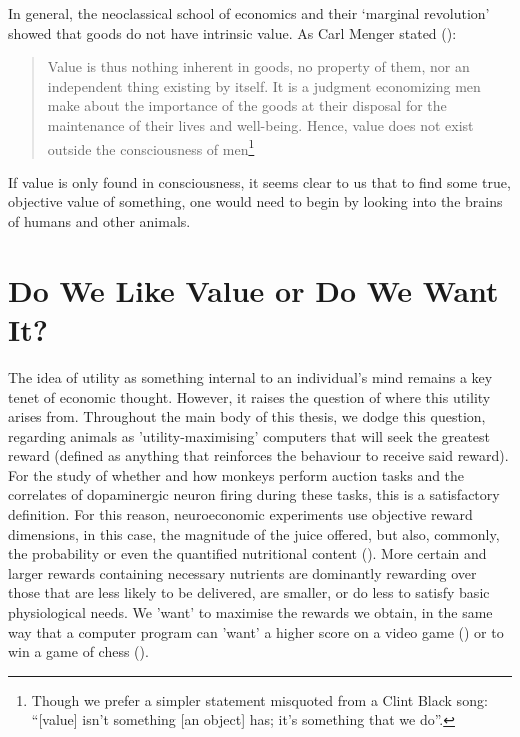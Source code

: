 In general, the neoclassical school of economics and their ‘marginal revolution’ showed that goods do not have intrinsic value. As Carl Menger stated (\cite{menger1950principles}):

\begin{quote}
Value is thus nothing inherent in goods, no property of them, nor an independent thing existing by itself. It is a judgment economizing men make about the importance of the goods  at their disposal for the maintenance of their lives and well-being. Hence, value does not exist outside the consciousness of men\footnote{Though we prefer a simpler statement misquoted from a Clint Black song:
“[value] isn’t something [an object] has; it’s something that we do”.}
\end{quote}

If value is only found in consciousness, it seems clear to us that to find some true, objective value of something, one would need to begin by looking into the brains of humans and other animals.

\section{Do We Like Value or Do We Want It?}

The idea of utility as something internal to an individual’s mind remains a key tenet of economic thought. However, it raises the question of where this utility arises from. Throughout the main body of this thesis, we dodge this question, regarding animals as 'utility-maximising' computers that will seek the greatest reward (defined as anything that reinforces the behaviour to receive said reward). For the study of whether and how monkeys perform auction tasks and the correlates of dopaminergic neuron firing during these tasks, this is a satisfactory definition. For this reason, neuroeconomic experiments use objective reward dimensions, in this case, the magnitude of the juice offered, but also, commonly, the probability or even the quantified nutritional content (\cite{grabenhorstRepresentationOralFat2014}). More certain and larger rewards containing necessary nutrients are dominantly rewarding over those that are less likely to be delivered, are smaller, or do less to satisfy basic physiological needs. We 'want' to maximise the rewards we obtain, in the same way that a computer program can 'want' a higher score on a video game (\cite{mnihPlayingAtariDeep2013}) or to win a game of chess (\cite{silverGeneralReinforcementLearning2018}).

